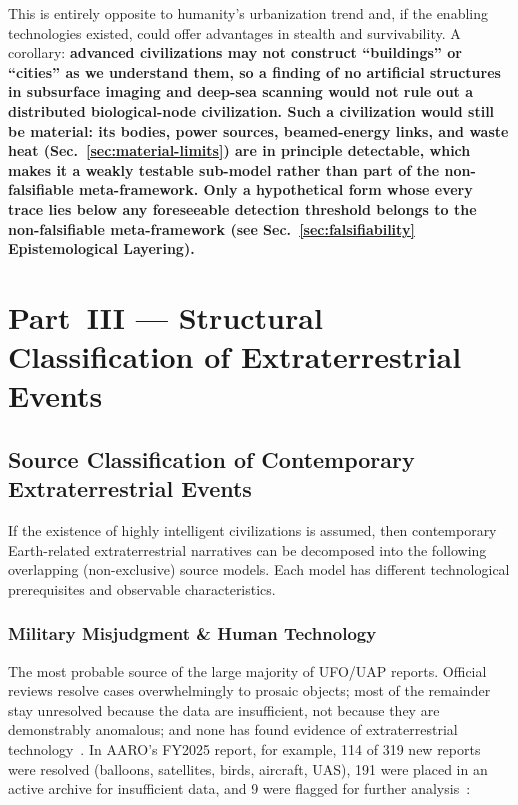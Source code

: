 \documentclass[aps,prd,twocolumn,superscriptaddress,nofootinbib]{revtex4-2}
\begin{document}
This is entirely opposite to humanity's urbanization trend and, if the enabling technologies existed, could offer advantages in stealth and survivability. A corollary: \textbf{advanced civilizations may not construct ``buildings'' or ``cities'' as we understand them, so a finding of no artificial structures in subsurface imaging and deep-sea scanning would not rule out a distributed biological-node civilization. Such a civilization would still be material: its bodies, power sources, beamed-energy links, and waste heat (Sec.~\ref{sec:material-limits}) are in principle detectable, which makes it a weakly testable sub-model rather than part of the non-falsifiable meta-framework. Only a hypothetical form whose every trace lies below any foreseeable detection threshold belongs to the non-falsifiable meta-framework (see Sec.~\ref{sec:falsifiability} Epistemological Layering).}


\section{Part~III --- Structural Classification of Extraterrestrial Events}\label{sec:part3}

\subsection{Source Classification of Contemporary Extraterrestrial Events}\label{sec:source-classification}

If the existence of highly intelligent civilizations is assumed, then contemporary Earth-related extraterrestrial narratives can be decomposed into the following overlapping (non-exclusive) source models. Each model has different technological prerequisites and observable characteristics.

\subsubsection{Military Misjudgment \& Human Technology}\label{sec:military}

The most probable source of the large majority of UFO/UAP reports. Official reviews resolve cases overwhelmingly to prosaic objects; most of the remainder stay unresolved because the data are insufficient, not because they are demonstrably anomalous; and none has found evidence of extraterrestrial technology~\cite{AARO2024,NASA_UAP2023,AARO2026}. In AARO's FY2025 report, for example, 114 of 319 new reports were resolved (balloons, satellites, birds, aircraft, UAS), 191 were placed in an active archive for insufficient data, and 9 were flagged for further analysis~\cite{AARO2026}:
\end{document}
